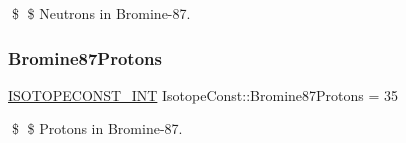 \$ \$ Neutrons in Bromine-\/87. \mbox{\label{group___isotope_const-_bromine-_br87_ga8f27758a925ec411edb5b6cd2a501cc5}} 
\subsubsection{\texorpdfstring{Bromine87\+Protons}{Bromine87Protons}}
{\footnotesize\ttfamily \mbox{\hyperlink{group___isotope_const-_macros_ga5f18360b3e99483a35c32d789e62621c}{I\+S\+O\+T\+O\+P\+E\+C\+O\+N\+S\+T\+\_\+\+I\+NT}} Isotope\+Const\+::\+Bromine87\+Protons = 35}

\$ \$ Protons in Bromine-\/87. 